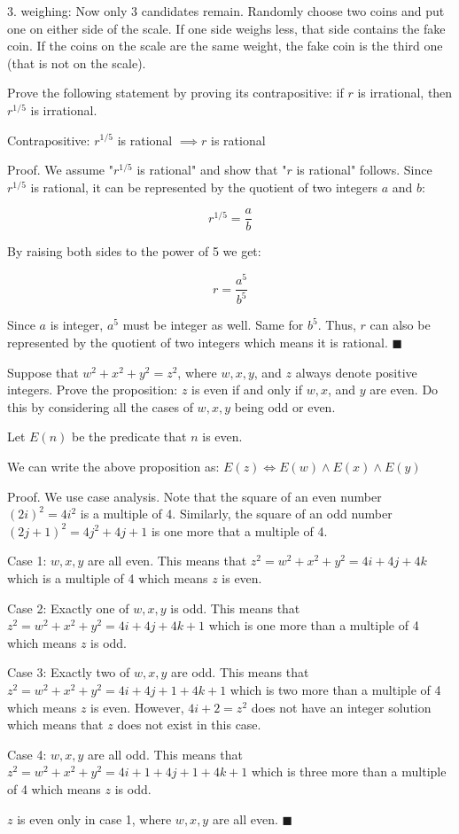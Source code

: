 \documentclass[../main.tex]{subfiles}
\begin{document}
\begin{questions}
\begin{solution}
  3. weighing: Now only 3 candidates remain. Randomly choose two coins and put one on either side of the scale. If one side weighs less, that side contains the fake coin. If the coins on the scale are the same weight, the fake coin is the third one (that is not on the scale).
\end{solution}

\question Prove the following statement by proving its contrapositive: if $r$ is irrational, then $r^{1/5}$ is irrational.
\begin{solution}

  Contrapositive: $r^{1/5}$ is rational $\implies r$ is rational

  Proof. We assume "$r^{1/5}$ is rational" and show that "$r$ is rational" follows. Since $r^{1/5}$ is rational, it can be represented by the quotient of two integers $a$ and $b$:

  $$
  r^{1/5} = \frac{a}{b}
  $$

  By raising both sides to the power of 5 we get:

  $$
  r = \frac{a^5}{b^5}
  $$

  Since $a$ is integer, $a^5$ must be integer as well. Same for $b^5$. Thus, $r$ can also be represented by the quotient of two integers which means it is rational. $\blacksquare$
\end{solution}

\question Suppose that $w^2 + x^2 + y^2 = z^2$, where $w, x, y$, and $z$ always denote positive integers. Prove the proposition: $z$ is even if and only if $w, x$, and $y$ are even. Do this by considering all the cases of $w, x, y$ being odd or even.
\begin{solution}

  Let $E(n)$ be the predicate that $n$ is even.

  We can write the above proposition as: $E(z) \iff E(w) \land E(x) \land E(y)$

  Proof. We use case analysis. Note that the square of an even number $(2i)^2 = 4i^2$ is a multiple of 4. Similarly, the square of an odd number $(2j + 1)^2 = 4j^2 + 4j + 1$ is one more that a multiple of 4.

  Case 1: $w, x, y$ are all even. This means that $z^2 = w^2 + x^2 + y^2 = 4i + 4j + 4k$ which is a multiple of 4 which means $z$ is even.

  Case 2: Exactly one of $w, x, y$ is odd. This means that $z^2 = w^2 + x^2 + y^2 = 4i + 4j + 4k + 1$ which is one more than a multiple of 4 which means $z$ is odd.

  Case 3: Exactly two of $w, x, y$ are odd. This means that $z^2 = w^2 + x^2 + y^2 = 4i + 4j + 1 + 4k + 1$ which is two more than a multiple of 4 which means $z$ is even. However, $4i + 2 = z^2$ does not have an integer solution which means that $z$ does not exist in this case.

  Case 4: $w, x, y$ are all odd. This means that $z^2 = w^2 + x^2 + y^2 = 4i + 1 + 4j + 1 + 4k + 1$ which is three more than a multiple of 4 which means $z$ is odd.

  $z$ is even only in case 1, where $w,x,y$ are all even. $\blacksquare$
\end{solution}
\end{questions}
\end{document}
